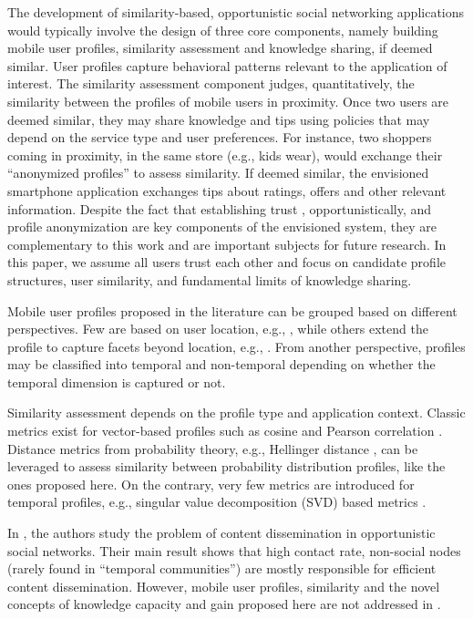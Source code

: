 \documentclass[conference]{IEEEtran}
\theoremstyle{definition}
\begin{document}
The development of similarity-based, opportunistic social networking 
applications would typically involve the design of three core 
components, namely building mobile user profiles, similarity assessment and knowledge 
sharing, if deemed similar. User profiles capture behavioral patterns relevant to the application of interest. The 
similarity assessment component judges, quantitatively, the similarity between 
the profiles of mobile users in proximity. Once two users are deemed similar, 
they may share knowledge and tips using policies that may depend on 
the service type and user preferences. For instance, two shoppers coming in 
proximity, in the same store (e.g., kids wear), would exchange their 
``anonymized profiles'' to assess similarity. If deemed similar, the envisioned 
smartphone application exchanges tips about ratings, offers and other relevant information. Despite 
the fact that establishing trust \cite{trust}, opportunistically, and profile 
anonymization are key components of the envisioned system, they are complementary 
to this work and are important subjects for future research. 
In this paper, we assume all users trust each other and focus on candidate profile structures, 
user similarity, and fundamental limits of knowledge sharing.

Mobile user profiles proposed in the literature can be grouped
based on different perspectives. Few are based on user location, e.g., 
\cite{profilecast,csi}, while others extend the profile to capture facets
beyond location, e.g., \cite{uspatent,mogh}. From another 
perspective, profiles may be classified into temporal and non-temporal
depending on whether the temporal dimension is captured or not.

Similarity assessment depends on the profile type and application context.
Classic metrics exist for vector-based profiles such as cosine and Pearson correlation
\cite{sim}. Distance metrics from probability theory, 
e.g., Hellinger distance \cite{sm}, can be leveraged to assess similarity between 
probability distribution profiles, like the ones proposed here. On the contrary, 
very few metrics are introduced for temporal profiles, e.g., singular value 
decomposition (SVD) based metrics \cite{csi}.

In \cite{mobihoc}, the authors study the problem of content dissemination in 
opportunistic social networks. Their main result shows that high contact rate, 
non-social nodes (rarely found in ``temporal communities'') are mostly responsible 
for efficient content dissemination. However, mobile user profiles, similarity 
and the novel concepts of knowledge capacity and gain proposed here are not 
addressed in \cite{mobihoc}.
\end{document}
